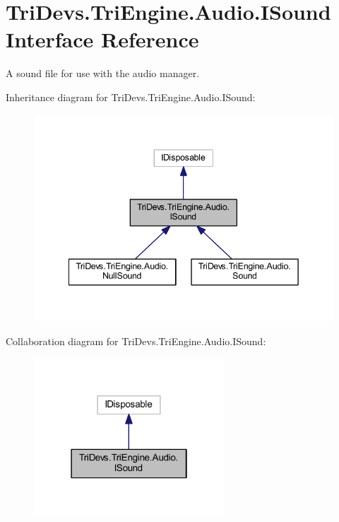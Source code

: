 \hypertarget{interface_tri_devs_1_1_tri_engine_1_1_audio_1_1_i_sound}{\section{Tri\-Devs.\-Tri\-Engine.\-Audio.\-I\-Sound Interface Reference}
\label{interface_tri_devs_1_1_tri_engine_1_1_audio_1_1_i_sound}
}


A sound file for use with the audio manager.  




Inheritance diagram for Tri\-Devs.\-Tri\-Engine.\-Audio.\-I\-Sound\-:
\nopagebreak
\begin{figure}[H]
\begin{center}
\leavevmode
\includegraphics[width=342pt]{interface_tri_devs_1_1_tri_engine_1_1_audio_1_1_i_sound__inherit__graph}
\end{center}
\end{figure}


Collaboration diagram for Tri\-Devs.\-Tri\-Engine.\-Audio.\-I\-Sound\-:
\nopagebreak
\begin{figure}[H]
\begin{center}
\leavevmode
\includegraphics[width=202pt]{interface_tri_devs_1_1_tri_engine_1_1_audio_1_1_i_sound__coll__graph}
\end{center}
\end{figure}
